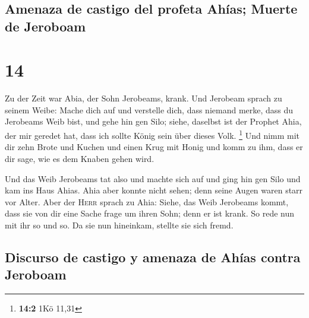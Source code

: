 \hypertarget{amenaza-de-castigo-del-profeta-ahuxedas-muerte-de-jeroboam}{%
\subsection{Amenaza de castigo del profeta Ahías; Muerte de
Jeroboam}\label{amenaza-de-castigo-del-profeta-ahuxedas-muerte-de-jeroboam}}

\hypertarget{section-13}{%
\section{14}\label{section-13}}

 Zu der Zeit war Abia, der Sohn Jerobeams, krank.
 Und Jerobeam sprach zu seinem Weibe: Mache dich auf und
verstelle dich, dass niemand merke, dass du Jerobeams Weib bist, und
gehe hin gen Silo; siehe, daselbst ist der Prophet Ahia, der mir geredet
hat, dass ich sollte König sein über dieses Volk. \footnote{\textbf{14:2}
  1Kö 11,31}  Und nimm mit dir zehn Brote und Kuchen und
einen Krug mit Honig und komm zu ihm, dass er dir sage, wie es dem
Knaben gehen wird.

 Und das Weib Jerobeams tat also und machte sich auf und
ging hin gen Silo und kam ins Haus Ahias. Ahia aber konnte nicht sehen;
denn seine Augen waren starr vor Alter.  Aber der
\textsc{Herr} sprach zu Ahia: Siehe, das Weib Jerobeams kommt, dass sie
von dir eine Sache frage um ihren Sohn; denn er ist krank. So rede nun
mit ihr so und so. Da sie nun hineinkam, stellte sie sich fremd.

\hypertarget{discurso-de-castigo-y-amenaza-de-ahuxedas-contra-jeroboam}{%
\subsection{Discurso de castigo y amenaza de Ahías contra
Jeroboam}\label{discurso-de-castigo-y-amenaza-de-ahuxedas-contra-jeroboam}}

